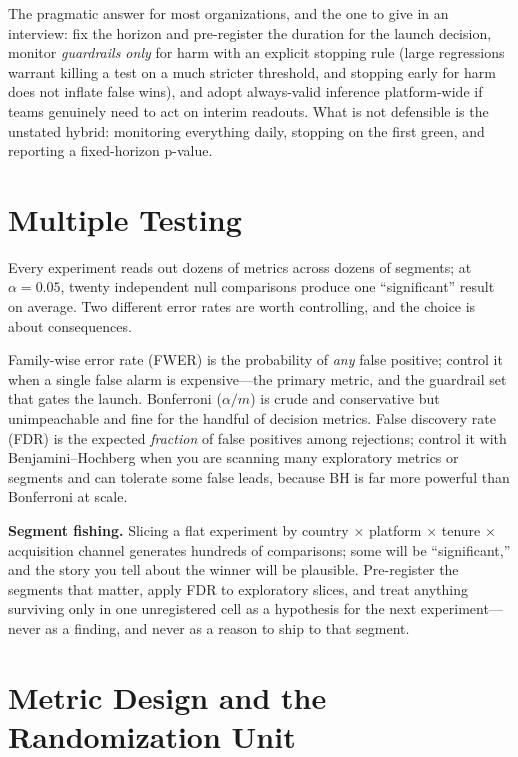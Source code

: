 The pragmatic answer for most organizations, and the one to give in an interview: fix the horizon and pre-register the duration for the launch decision, monitor \emph{guardrails only} for harm with an explicit stopping rule (large regressions warrant killing a test on a much stricter threshold, and stopping early for harm does not inflate false wins), and adopt always-valid inference platform-wide if teams genuinely need to act on interim readouts. What is not defensible is the unstated hybrid: monitoring everything daily, stopping on the first green, and reporting a fixed-horizon p-value.

\section{Multiple Testing}
\label{cml:sec:multiple_testing}

Every experiment reads out dozens of metrics across dozens of segments; at $\alpha=0.05$, twenty independent null comparisons produce one ``significant'' result on average. Two different error rates are worth controlling, and the choice is about consequences.

Family-wise error rate (FWER) is the probability of \emph{any} false positive; control it when a single false alarm is expensive---the primary metric, and the guardrail set that gates the launch. Bonferroni ($\alpha/m$) is crude and conservative but unimpeachable and fine for the handful of decision metrics. False discovery rate (FDR) is the expected \emph{fraction} of false positives among rejections; control it with Benjamini--Hochberg when you are scanning many exploratory metrics or segments and can tolerate some false leads, because BH is far more powerful than Bonferroni at scale.

\begin{warningbox}
\textbf{Segment fishing.} Slicing a flat experiment by country $\times$ platform $\times$ tenure $\times$ acquisition channel generates hundreds of comparisons; some will be ``significant,'' and the story you tell about the winner will be plausible. Pre-register the segments that matter, apply FDR to exploratory slices, and treat anything surviving only in one unregistered cell as a hypothesis for the next experiment---never as a finding, and never as a reason to ship to that segment.
\end{warningbox}

\section{Metric Design and the Randomization Unit}
\label{cml:sec:metric_design}

